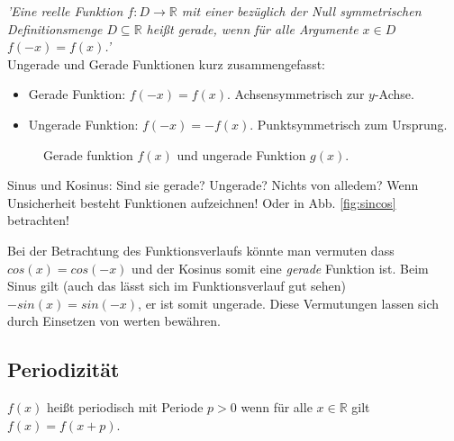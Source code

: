\emph{'Eine reelle Funktion $f\colon D\to \mathbb {R} $ mit einer bezüglich der Null symmetrischen Definitionsmenge 
$ D\subseteq \mathbb {R}$ heißt gerade, wenn für alle Argumente $ x\in D$  $f(-x)=f(x)$.'} \\

Ungerade und Gerade Funktionen kurz zusammengefasst:
\begin{itemize}
    \item Gerade Funktion:  $f(-x) = f(x)$. Achsensymmetrisch zur $y$-Achse.
    \item Ungerade Funktion:  $f(-x) = -f(x)$. Punktsymmetrisch zum Ursprung.
\end{itemize}

    \begin{figure}[H]
        \centering
        
        \caption{Gerade funktion $f(x)$ und ungerade Funktion $g(x)$.}
        \label{fig:evenUneven}
    \end{figure}

\begin{question}
Sinus und Kosinus: Sind sie gerade? Ungerade? Nichts von alledem? Wenn Unsicherheit besteht Funktionen aufzeichnen! Oder in Abb. \ref{fig:sincos} betrachten!
\end{question}

\begin{answer}
Bei der Betrachtung des Funktionsverlaufs könnte man vermuten dass $cos(x) = cos(-x)$ und der Kosinus somit eine \emph{gerade} Funktion ist. 
Beim Sinus gilt (auch das lässt sich im Funktionsverlauf gut sehen) $-sin(x) = sin(-x)$, er ist somit ungerade. Diese Vermutungen lassen sich durch Einsetzen von werten bewähren. 
\end{answer}








\subsection{Periodizität}
$f(x)$ heißt periodisch mit Periode $p>0$ wenn für alle $ x \in \mathbb{R}$ gilt $f(x) = f(x+p)$.

